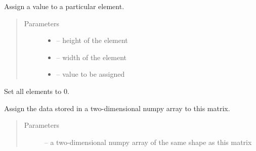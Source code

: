\documentclass[letterpaper,10pt,english]{sphinxmanual}
\begin{document}
\begin{fulllineitems}
\begin{fulllineitems}
\label{\detokenize{index:dbm_py.interface.Matrix.assign}}
Assign a value to a particular element.
\begin{quote}\begin{description}
\item[{Parameters}] \leavevmode\begin{itemize}
\item {} 
 -- height of the element

\item {} 
 -- width of the element

\item {} 
 -- value to be assigned

\end{itemize}

\end{description}\end{quote}

\end{fulllineitems}


\begin{fulllineitems}
\label{\detokenize{index:dbm_py.interface.Matrix.clear}}
Set all elements to 0.

\end{fulllineitems}


\begin{fulllineitems}
\label{\detokenize{index:dbm_py.interface.Matrix.from_np2darray}}
Assign the data stored in a two-dimensional numpy array to
this matrix.
\begin{quote}\begin{description}
\item[{Parameters}] \leavevmode
{} -- a two-dimensional numpy array of the same shape as this matrix

\end{description}\end{quote}

\end{fulllineitems}


\end{fulllineitems}
\end{document}
